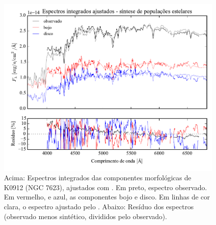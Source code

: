 \begin{figure}
	\includegraphics[page=17,width=\textwidth]{figuras/sample006a_synthesis}
	\caption[Espectros ajustados com \starlight das componentes morfológicas de
	K0912 (NGC 7623)]
	{Acima: Espectros integrados das componentes morfológicas de
	K0912 (NGC 7623), ajustados com \starlight. Em preto, espectro observado. Em
	vermelho, e azul, as componentes bojo e disco. Em linhas de cor clara, o
	espectro ajustado pelo \starlight. Abaixo: Resíduo dos espectros (observado
	menos sintético, divididos pelo observado).}
	\label{fig:decompSintese:K0912}
\end{figure}

